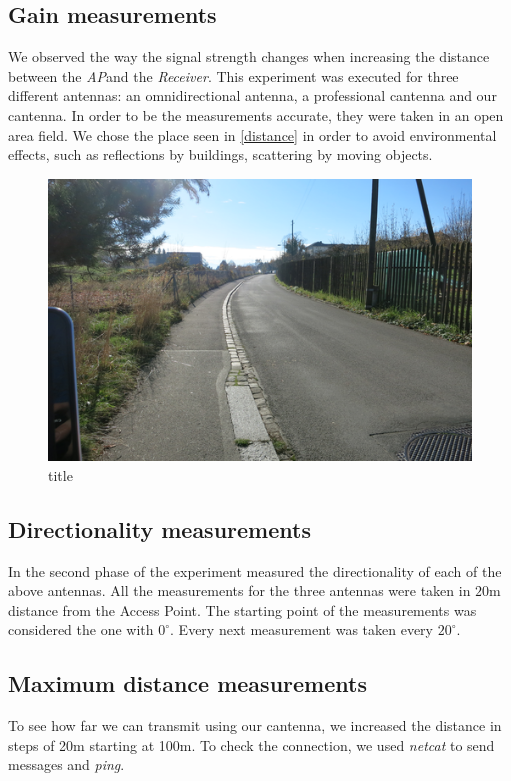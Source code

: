 \documentclass[12pt,a4paper]{article}
\newcommand{\rc}[0]{\emph{Receiver}}
\newcommand{\ap}[0]{\emph{AP}}
\begin{document}
		\subsection{Gain measurements}
			We observed the way the signal strength changes when increasing the distance between the \ap and the \rc. This experiment was executed for three different antennas: an omnidirectional antenna, a professional cantenna and our cantenna.
			In order to be the measurements accurate, they were taken in an open area field. We chose the place seen in \autoref{distance} in order to avoid environmental effects, such as reflections by buildings, scattering by moving objects.
			\begin{figure}
				\includegraphics[width=\textwidth]{images/distance.png}
				\caption{title}
				\label{distance}
			\end{figure}
		
		\subsection{Directionality measurements}
			In the second phase of the experiment measured the directionality of each of the above antennas. All the measurements for the three antennas were taken in $20$m distance from the Access Point. The starting point of the measurements was considered the one with $0^{\circ}$. Every next measurement was taken every $20^{\circ}$.

		\subsection{Maximum distance measurements}
			To see how far we can transmit using our cantenna, we increased the distance in steps of 20m starting at 100m. To check the connection, we used \emph{netcat} to send messages and \emph{ping}.
		
\end{document}
